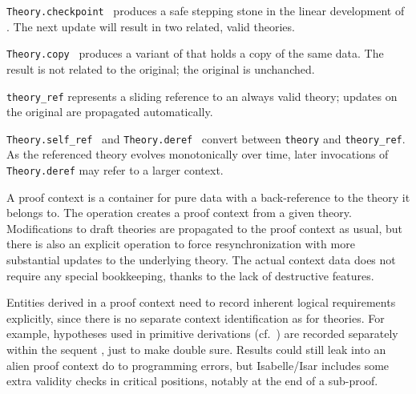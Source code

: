 \begin{isabellebody}
\begin{isamarkuptext}
\begin{description}
  \item \verb|Theory.checkpoint|~ produces a safe
  stepping stone in the linear development of .  The next
  update will result in two related, valid theories.

  \item \verb|Theory.copy|~ produces a variant of  that holds a copy of the same data.  The result is not
  related to the original; the original is unchanched.

  \item \verb|theory_ref| represents a sliding reference to an
  always valid theory; updates on the original are propagated
  automatically.

  \item \verb|Theory.self_ref|~ and \verb|Theory.deref|~ convert between \verb|theory| and \verb|theory_ref|.  As the referenced theory
  evolves monotonically over time, later invocations of \verb|Theory.deref| may refer to a larger context.

  \end{description}%
\end{isamarkuptext}%
\isamarkuptrue%
%
\endisatagmlref
{\isafoldmlref}%
%
\isadelimmlref
%
\endisadelimmlref
%
\isamarkuptrue%
%
\begin{isamarkuptext}%

  A proof context is a container for pure data with a back-reference
  to the theory it belongs to.  The  operation creates a
  proof context from a given theory.  Modifications to draft theories
  are propagated to the proof context as usual, but there is also an
  explicit  operation to force resynchronization
  with more substantial updates to the underlying theory.  The actual
  context data does not require any special bookkeeping, thanks to the
  lack of destructive features.

  Entities derived in a proof context need to record inherent logical
  requirements explicitly, since there is no separate context
  identification as for theories.  For example, hypotheses used in
  primitive derivations (cf.\ ) are recorded
  separately within the sequent \isa{{\isasymGamma}\ {\isasymturnstile}\ {\isasymphi}}, just to make double
  sure.  Results could still leak into an alien proof context do to
  programming errors, but Isabelle/Isar includes some extra validity
  checks in critical positions, notably at the end of a sub-proof.


\end{isamarkuptext}
\end{isabellebody}
